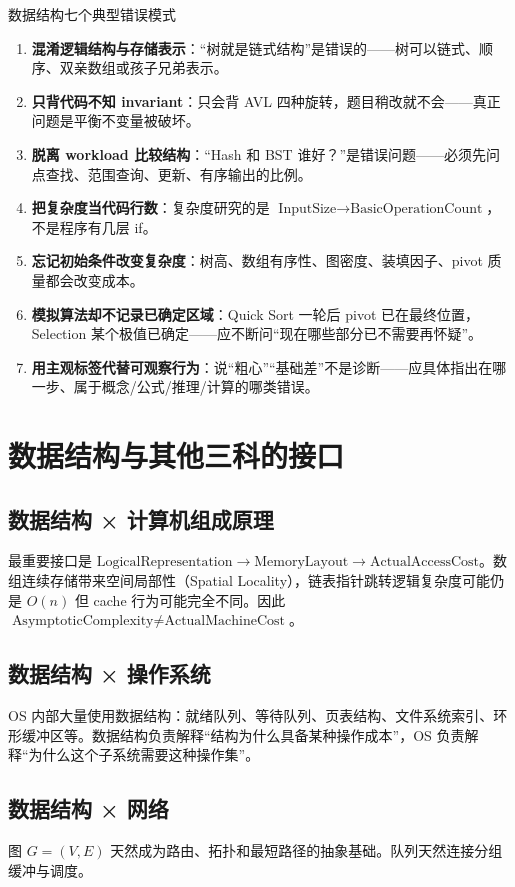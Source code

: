 \documentclass[11pt,a4paper,openany]{ctexbook}
\newcommand{\key}[1]{\textbf{\color{deep}#1}}
\begin{document}
\begin{warnbox}{数据结构七个典型错误模式}
\begin{enumerate}
  \item \key{混淆逻辑结构与存储表示}：“树就是链式结构”是错误的——树可以链式、顺序、双亲数组或孩子兄弟表示。
  \item \key{只背代码不知 invariant}：只会背 AVL 四种旋转，题目稍改就不会——真正问题是平衡不变量被破坏。
  \item \key{脱离 workload 比较结构}：“Hash 和 BST 谁好？”是错误问题——必须先问点查找、范围查询、更新、有序输出的比例。
  \item \key{把复杂度当代码行数}：复杂度研究的是 $\text{InputSize}\rightarrow\text{BasicOperationCount}$，不是程序有几层 if。
  \item \key{忘记初始条件改变复杂度}：树高、数组有序性、图密度、装填因子、pivot 质量都会改变成本。
  \item \key{模拟算法却不记录已确定区域}：Quick Sort 一轮后 pivot 已在最终位置，Selection 某个极值已确定——应不断问“现在哪些部分已不需要再怀疑”。
  \item \key{用主观标签代替可观察行为}：说“粗心”“基础差”不是诊断——应具体指出在哪一步、属于概念/公式/推理/计算的哪类错误。
\end{enumerate}
\end{warnbox}

\section{数据结构与其他三科的接口}

\subsection{数据结构 × 计算机组成原理}
最重要接口是 $\text{LogicalRepresentation}\rightarrow\text{MemoryLayout}\rightarrow\text{ActualAccessCost}$。数组连续存储带来空间局部性（Spatial Locality），链表指针跳转逻辑复杂度可能仍是 $O(n)$ 但 cache 行为可能完全不同。因此 $\text{AsymptoticComplexity}\neq\text{ActualMachineCost}$。

\subsection{数据结构 × 操作系统}
OS 内部大量使用数据结构：就绪队列、等待队列、页表结构、文件系统索引、环形缓冲区等。数据结构负责解释“结构为什么具备某种操作成本”，OS 负责解释“为什么这个子系统需要这种操作集”。

\subsection{数据结构 × 网络}
图 $G=(V,E)$ 天然成为路由、拓扑和最短路径的抽象基础。队列天然连接分组缓冲与调度。
\end{document}
